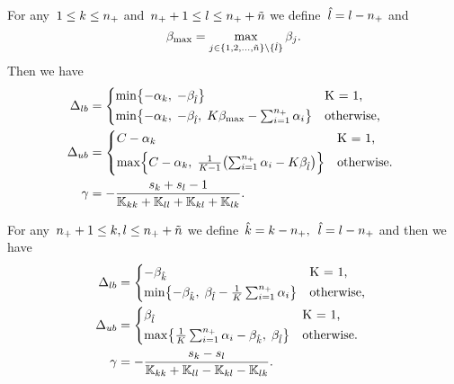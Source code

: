 \begin{lemma}
  For any~$1 \le k \le n_{+}$ and~$n_{+} + 1 \le l \le n_{+} + \tilde{n}$ we define~$\hat{l} = l - n_{+}$ and
  \begin{equation*}
    \beta_{\max} = \max_{j \in \{1, 2, \ldots, \tilde{n} \} \setminus \{\hat{l}\}} \beta_j.
  \end{equation*}
  Then we have
  \begin{align*}
    \Delta_{lb} & = 
      \begin{cases*}
        \min \Brac[c]{- \alphak,\;  -\betal} & K = 1, \\
        \min \Brac[c]{- \alphak,\;  -\betal, \; K\beta_{\max} - \sum_{i = 1}^{\npos} \alpha_i} & \textrm{otherwise},
      \end{cases*} \\
    \Delta_{ub} & = 
      \begin{cases*}
          C - \alphak & K = 1, \\
          \max \Brac[c]{C - \alphak, \; \frac{1}{K-1}\Brac{\sum_{i = 1}^{\npos} \alpha_i - K \betal}}  & \textrm{otherwise}.
      \end{cases*} \\
    \gamma & = - \frac{s_k + s_l - 1}{\K_{kk} + \K_{ll} + \K_{kl} + \K_{lk}}.
  \end{align*}
\end{lemma}

\begin{lemma}
  For any~$n_{+} + 1\le k,l \le n_{+} + \tilde{n}$ we define~$\hat{k} = k - n_{+},$~$\hat{l} = l - n_{+}$ and then we have
    \begin{align*}
      \Delta_{lb} & = 
        \begin{cases*}
          - \betak & K = 1, \\
          \min \Brac[c]{- \betak,\; \betal - \frac{1}{K} \sum_{i = 1}^{\npos} \alpha_i} & \textrm{otherwise},
        \end{cases*} \\
      \Delta_{ub} & = 
        \begin{cases*}
          \betal & K = 1, \\
          \max \Brac[c]{\frac{1}{K} \sum_{i = 1}^{\npos} \alpha_i - \betak,\; \betal} & \textrm{otherwise}.
        \end{cases*} \\
      \gamma & = -\frac{s_k - s_l}{\K_{kk} + \K_{ll} - \K_{kl} - \K_{lk}}.
    \end{align*}
\end{lemma}

